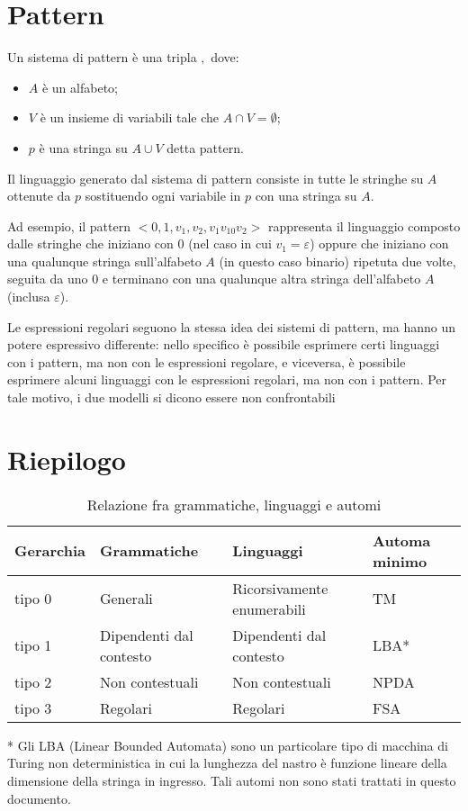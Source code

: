   \section{Pattern}

  \begin{definition}
    Un sistema di pattern è una tripla \(<A, V, p>,\) dove:
    \begin{itemize}
      \item \(A\) è un alfabeto;
      \item \(V\) è un insieme di variabili tale che \(A\cap V=\emptyset\);
      \item \(p\) è una stringa su \(A\cup V\) detta pattern.
    \end{itemize}
  \end{definition}

  \noindent
  Il linguaggio generato dal sistema di pattern consiste in tutte le stringhe su \(A\) ottenute da \(p\) sostituendo ogni variabile in \(p\) con una stringa su \(A\). 

  Ad esempio, il pattern \(<{0,1}, {v_1, v_2}, v_1v_10v_2>\) rappresenta il linguaggio composto dalle stringhe che iniziano con 0 (nel caso in cui \(v_1 = \varepsilon\)) oppure che iniziano con una qualunque stringa sull'alfabeto \(A\) (in questo caso binario) ripetuta due volte, seguita da uno 0 e terminano con una qualunque altra stringa dell'alfabeto \(A\) (inclusa \(\varepsilon\)).

  Le espressioni regolari seguono la stessa idea dei sistemi di pattern, ma hanno un potere espressivo differente: nello specifico è possibile esprimere certi linguaggi con i pattern, ma non con le espressioni regolare, e viceversa, è possibile esprimere alcuni linguaggi con le espressioni regolari, ma non con i pattern. Per tale motivo, i due modelli si dicono essere non confrontabili

  \section{Riepilogo}

  \begin{table}[ht]
    \caption{Relazione fra grammatiche, linguaggi e automi}
    \centering
    \vspace{10px}
    \begin{tabular}{l l l l}
      Gerarchia & Grammatiche & Linguaggi & Automa minimo \\ 
      \hline
      tipo 0 & Generali & Ricorsivamente enumerabili & TM\\
      tipo 1 & Dipendenti dal contesto & Dipendenti dal contesto & LBA*\\
      tipo 2 & Non contestuali & Non contestuali & NPDA\\
      tipo 3 & Regolari & Regolari & FSA\\
    \end{tabular}
  \end{table}

  * Gli LBA (Linear Bounded Automata) sono un particolare tipo di macchina di Turing non deterministica in cui la lunghezza del nastro è funzione lineare della dimensione della stringa in ingresso. Tali automi non sono stati trattati in questo documento. 